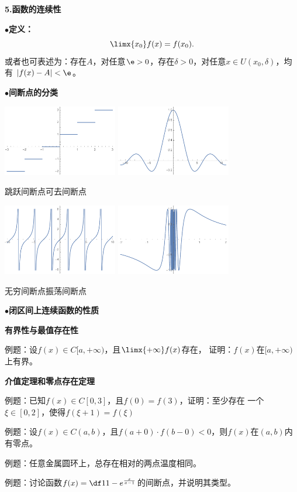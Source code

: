 {\bf 5.函数的连续性}

$\bullet${\bf 定义：}
$$\limx{x_0}f(x)=f(x_0).$$
或者也可表述为：存在$A$，对任意$\e>0$，存在$\delta>0$，对任意$x\in U(x_0,\delta)$，均有
$|f(x)-A|<\e$。

$\bullet${\bf 间断点的分类}

\begin{center}
	\includegraphics[width=5cm]{./images/ch3/roundx.pdf}\quad
	\includegraphics[width=5cm]{./images/ch3/sinxox.pdf}
	
	跳跃间断点\hspace{4cm}可去间断点
	
	\includegraphics[width=5cm]{./images/ch3/tanx.pdf}\quad
	\includegraphics[width=5cm]{./images/ch3/sin1ox.pdf}
	
	无穷间断点\hspace{4cm}振荡间断点
\end{center}

$\bullet${\bf 闭区间上连续函数的性质}

{\bf 有界性与最值存在性}

例题：设$f(x)\in C[a,+\infty)$，且$\limx{+\infty}f(x)$存在，
证明：$f(x)$在$[a,+\infty)$上有界。

{\bf 介值定理和零点存在定理}

例题：已知$f(x)\in C[0,3]$，且$f(0)=f(3)$，证明：至少存在
一个$\xi\in[0,2]$，使得$f(\xi+1)=f(\xi)$

例题：设$f(x)\in C(a,b)$，且$f(a+0)\cdot f(b-0)<0$，则$f(x)$在$(a,b)$内有零点。

例题：任意金属圆环上，总存在相对的两点温度相同。

例题：讨论函数$f(x)=\df1{1-e^{\frac{x}{x-1}}}$的间断点，并说明其类型。